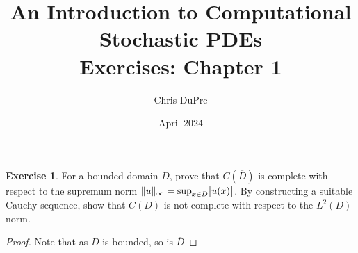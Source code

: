 \documentclass{amsart}
\title{An Introduction to Computational Stochastic PDEs\\ Exercises: Chapter 1}
\author{Chris DuPre }
\date{April 2024}
\theoremstyle{plain}
\theoremstyle{definition}
\newtheorem{exer}{Exercise}[section]
\begin{document}
\maketitle
\setcounter{section}{1}
\begin{exer}
For a bounded domain $D$, prove that $C\left(\overline{D}\right)$ is complete with respect to the supremum
norm $\|u\|_{\infty} = \sup_{x \in D} \abs{u(x)}$. By constructing a suitable Cauchy sequence, show that
$C(D)$ is not complete with respect to the $L^{2}(D)$ norm. 
\end{exer}
\begin{proof}
    Note that as $D$ is bounded, so is $\overline{D}$
\end{proof}

\printbibliography
\end{document}
